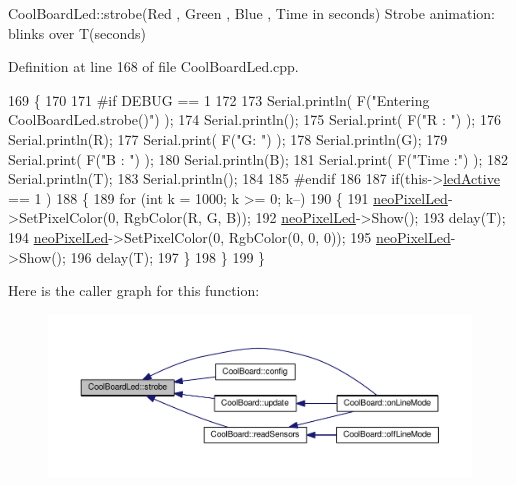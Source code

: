 Cool\+Board\+Led\+::strobe(\+Red , Green , Blue , Time in seconds) Strobe animation\+: blinks over T(seconds) 

Definition at line 168 of file Cool\+Board\+Led.\+cpp.


\begin{DoxyCode}
169 \{
170 
171 \textcolor{preprocessor}{#if DEBUG == 1}
172 
173     Serial.println( F(\textcolor{stringliteral}{"Entering CoolBoardLed.strobe()"}) );
174     Serial.println();
175     Serial.print( F(\textcolor{stringliteral}{"R : "}) );
176     Serial.println(R);
177     Serial.print( F(\textcolor{stringliteral}{"G: "}) );
178     Serial.println(G);
179     Serial.print( F(\textcolor{stringliteral}{"B : "}) );
180     Serial.println(B);
181     Serial.print( F(\textcolor{stringliteral}{"Time :"}) );
182     Serial.println(T);
183     Serial.println();
184 
185 \textcolor{preprocessor}{#endif  }
186 
187     \textcolor{keywordflow}{if}(this->\hyperlink{class_cool_board_led_aadd04d2ecf123247718d77f42fba7f08}{ledActive} == 1 )
188     \{   
189         \textcolor{keywordflow}{for} (\textcolor{keywordtype}{int} k = 1000; k >= 0; k--) 
190         \{
191             \hyperlink{class_cool_board_led_ac2c13fa462a010cd9242bf297c013923}{neoPixelLed}->SetPixelColor(0, RgbColor(R, G, B));
192             \hyperlink{class_cool_board_led_ac2c13fa462a010cd9242bf297c013923}{neoPixelLed}->Show();
193             delay(T);
194             \hyperlink{class_cool_board_led_ac2c13fa462a010cd9242bf297c013923}{neoPixelLed}->SetPixelColor(0, RgbColor(0, 0, 0));
195             \hyperlink{class_cool_board_led_ac2c13fa462a010cd9242bf297c013923}{neoPixelLed}->Show();
196             delay(T);
197         \}
198     \}
199 \}
\end{DoxyCode}
Here is the caller graph for this function\+:\nopagebreak
\begin{figure}[H]
\begin{center}
\leavevmode
\includegraphics[width=350pt]{de/dc0/class_cool_board_led_ad5f0de4c628cbfbf49896042831c64ad_icgraph}
\end{center}
\end{figure}
\mbox{\label{class_cool_board_led_a30fadd4cbec17ceea428bf7a32207e87}} 
